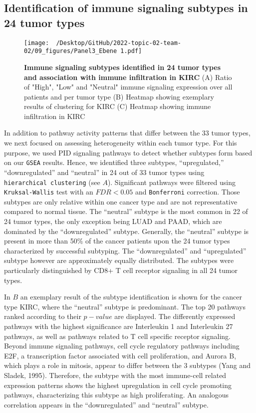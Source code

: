 \documentclass[
  parskip,
  openany]{scrreprt}
\begin{document}
\hypertarget{identification-of-immune-signaling-subtypes-in-24-tumor-types}{%
\subsection{Identification of immune signaling subtypes in 24 tumor
types}\label{identification-of-immune-signaling-subtypes-in-24-tumor-types}}

\begin{figure}[h]
  \texttt{[image: ~/Desktop/GitHub/2022-topic-02-team-02/09\_figures/Panel3\_Ebene 1.pdf]}
  \caption{\textbf{Immune signaling subtypes identified in 24 tumor types and association with immune infiltration in KIRC} (A) Ratio of "High", "Low" and "Neutral" immune signaling expression over all patients and per tumor type (B) Heatmap showing exemplary results of clustering for KIRC (C) Heatmap showing immune infiltration in KIRC}
  \label{pengplot}
\end{figure}

In addition to pathway activity patterns that differ between the 33
tumor types, we next focused on assessing heterogeneity within each
tumor type. For this purpose, we used PID signaling pathways to detect
whether subtypes form based on our \texttt{GSEA} results. Hence, we
identified three subtypes, ``upregulated,'' ``downregulated'' and
``neutral'' in 24 out of 33 tumor types using
\texttt{hierarchical\ clustering} (see  \(A\)).
Significant pathways were filtered using \texttt{Kruksal-Wallis} test
with an \(FDR < 0.05\) and \texttt{Bonferroni} correction. Those
subtypes are only relative within one cancer type and are not
representative compared to normal tissue. The ``neutral'' subtype is the
most common in 22 of 24 tumor types, the only exception being LUAD and
PAAD, which are dominated by the ``downregulated'' subtype. Generally,
the ``neutral'' subtype is present in more than 50\% of the cancer
patients upon the 24 tumor types characterized by successful subtyping.
The ``downregulated'' and ``upregulated'' subtype however are
approximately equally distributed. The subtypes were particularly
distinguished by CD8+ T cell receptor signaling in all 24 tumor types.

In  \(B\) an exemplary result of the subtype
identification is shown for the cancer type KIRC, where the ``neutral''
subtype is predominant. The top 20 pathways ranked according to their
\(p-value\) are displayed. The differently expressed pathways with the
highest significance are Interleukin 1 and Interleukin 27 pathways, as
well as pathways related to T cell specific receptor signaling. Beyond
immune signaling pathways, cell cycle regulatory pathways including E2F,
a transcription factor associated with cell proliferation, and Aurora B,
which plays a role in mitosis, appear to differ between the 3 subtypes
(Yang and Sladek, 1995). Therefore, the subtype with the most
immune-cell related expression patterns shows the highest upregulation
in cell cycle promoting pathways, characterizing this subtype as high
proliferating. An analogous correlation appears in the ``downregulated''
and ``neutral'' subtype.
\end{document}
